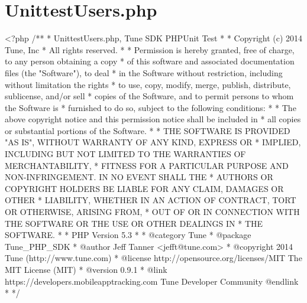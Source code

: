 \hypertarget{UnittestUsers_8php-example}{\section{Unittest\-Users.\-php}
}




\begin{DoxyCodeInclude}
<?php\textcolor{comment}{}
\textcolor{comment}{/**}
\textcolor{comment}{ * UnittestUsers.php, Tune SDK PHPUnit Test}
\textcolor{comment}{ *}
\textcolor{comment}{ * Copyright (c) 2014 Tune, Inc}
\textcolor{comment}{ * All rights reserved.}
\textcolor{comment}{ *}
\textcolor{comment}{ * Permission is hereby granted, free of charge, to any person obtaining a copy}
\textcolor{comment}{ * of this software and associated documentation files (the "Software"), to deal}
\textcolor{comment}{ * in the Software without restriction, including without limitation the rights}
\textcolor{comment}{ * to use, copy, modify, merge, publish, distribute, sublicense, and/or sell}
\textcolor{comment}{ * copies of the Software, and to permit persons to whom the Software is}
\textcolor{comment}{ * furnished to do so, subject to the following conditions:}
\textcolor{comment}{ *}
\textcolor{comment}{ * The above copyright notice and this permission notice shall be included in}
\textcolor{comment}{ * all copies or substantial portions of the Software.}
\textcolor{comment}{ *}
\textcolor{comment}{ * THE SOFTWARE IS PROVIDED "AS IS", WITHOUT WARRANTY OF ANY KIND, EXPRESS OR}
\textcolor{comment}{ * IMPLIED, INCLUDING BUT NOT LIMITED TO THE WARRANTIES OF MERCHANTABILITY,}
\textcolor{comment}{ * FITNESS FOR A PARTICULAR PURPOSE AND NON-INFRINGEMENT. IN NO EVENT SHALL THE}
\textcolor{comment}{ * AUTHORS OR COPYRIGHT HOLDERS BE LIABLE FOR ANY CLAIM, DAMAGES OR OTHER}
\textcolor{comment}{ * LIABILITY, WHETHER IN AN ACTION OF CONTRACT, TORT OR OTHERWISE, ARISING FROM,}
\textcolor{comment}{ * OUT OF OR IN CONNECTION WITH THE SOFTWARE OR THE USE OR OTHER DEALINGS IN}
\textcolor{comment}{ * THE SOFTWARE.}
\textcolor{comment}{ *}
\textcolor{comment}{ * PHP Version 5.3}
\textcolor{comment}{ *}
\textcolor{comment}{ * @category  Tune}
\textcolor{comment}{ * @package   Tune\_PHP\_SDK}
\textcolor{comment}{ * @author    Jeff Tanner <jefft@tune.com>}
\textcolor{comment}{ * @copyright 2014 Tune (http://www.tune.com)}
\textcolor{comment}{ * @license   http://opensource.org/licenses/MIT The MIT License (MIT)}
\textcolor{comment}{ * @version   0.9.1}
\textcolor{comment}{ * @link      https://developers.mobileapptracking.com Tune Developer Community @endlink}
\textcolor{comment}{ *}
\textcolor{comment}{ */}


\end{DoxyCodeInclude}

